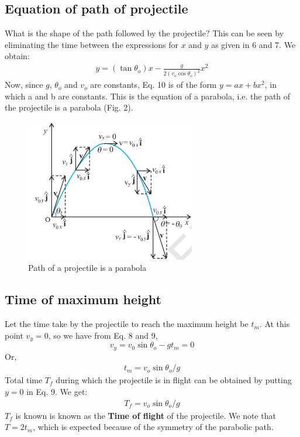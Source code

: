 \documentclass[12pt]{article}
\begin{document}
\subsection{Equation of path of projectile}
What is the shape of the path followed by the projectile? This can be seen by eliminating the time between the expressions for $x$ and $y$ as given in 6 and 7. We obtain:
\begin{align}
    y = (\tan\theta_o)x - \frac{g}{2(v_o\cos\theta_o)^2}x^2
\end{align}
Now, since $g$, $\theta_o$ and $v_o$ are constants, Eq. 10 is of the form $y = ax + bx^2$, in which a and b are constants. This is the equation of a parabola, i.e. the path of the projectile is a parabola (Fig. 2).
\begin{figure}[H]
    \centering
    \includegraphics[width=0.66\textwidth]{fig2.JPG}
    \caption{Path of a projectile is a parabola \cite{ref3}}
    \label{fig:fig2.JPEG}
\end{figure}
\subsection{Time of maximum height}
Let the time take by the projectile to reach the maximum height be $t_m$. At this point $v_y = 0$, so we have from Eq. 8 and 9, $$v_y = v_0\sin\theta_o - gt_m = 0$$
Or, 
\begin{align}
    t_m = v_o\sin\theta_o/g
\end{align}
Total time $T_f$ during which the projectile is in flight can be obtained by putting $y = 0$ in Eq. 9. We get:
\begin{align}
    T_f = v_o\sin\theta_o/g
\end{align}
$T_f$ is known is known as the \textbf{Time of flight} of the projectile. We note that $T = 2t_m$, which is expected because of the symmetry of the parabolic path.
\end{document}
